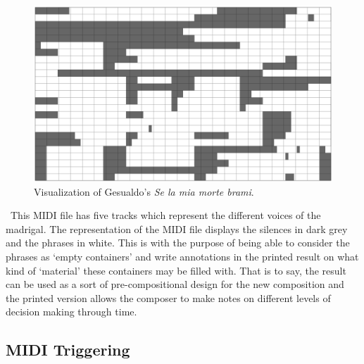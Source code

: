 \begin{figure}[htbp] %
   \centering
   \includegraphics[width=16cm]{Chapter4/midi_gesualdo.tif} %
   \caption{Visualization of Gesualdo's \emph{Se la mia morte brami}.}
   \label{fig:example}
\end{figure}\
This MIDI file has five tracks which represent the different voices of the madrigal. The representation of the MIDI file displays the silences in dark grey and the phrases in white. This is with the purpose of being able to consider the phrases as `empty containers' and write annotations in the printed result on what kind of `material' these containers may be filled with. That is to say, the result can be used as a sort of pre-compositional design for the new composition and the printed version allows the composer to make notes on different levels of decision making through time.


\subsection{MIDI Triggering}

